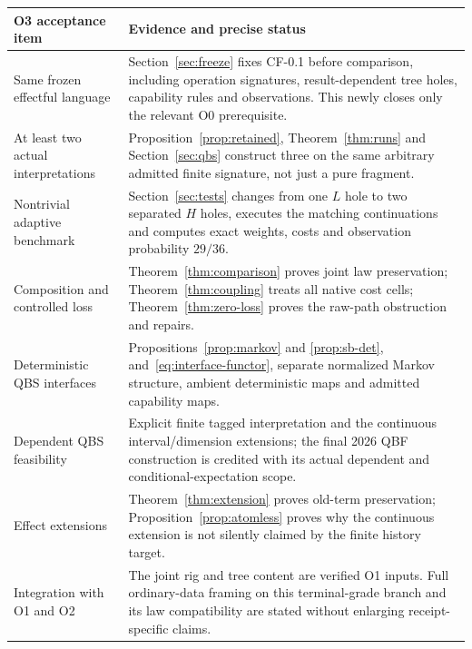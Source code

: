 \documentclass[11pt,a4paper]{article}
\theoremstyle{definition}
\begin{document}
\begin{longtable}{@{}p{.34\linewidth}p{.60\linewidth}@{}}
\toprule
O3 acceptance item&Evidence and precise status\\
\midrule\endhead
Same frozen effectful language&Section~\ref{sec:freeze} fixes CF-0.1 before
comparison, including operation signatures, result-dependent tree holes,
capability rules and observations. This newly closes only the relevant O0
prerequisite.\\
At least two actual interpretations&Proposition~\ref{prop:retained},
Theorem~\ref{thm:runs} and Section~\ref{sec:qbs} construct three on the same
arbitrary admitted finite signature, not just a pure fragment.\\
Nontrivial adaptive benchmark&Section~\ref{sec:tests} changes from one $L$
hole to two separated $H$ holes, executes the matching continuations and
computes exact weights, costs and observation probability $29/36$.\\
Composition and controlled loss&Theorem~\ref{thm:comparison} proves joint
law preservation; Theorem~\ref{thm:coupling} treats all native cost cells;
Theorem~\ref{thm:zero-loss} proves the raw-path obstruction and repairs.\\
Deterministic QBS interfaces&Propositions~\ref{prop:markov} and
\ref{prop:sb-det}, and~\eqref{eq:interface-functor}, separate normalized
Markov structure, ambient deterministic maps and admitted capability maps.\\
Dependent QBS feasibility&Explicit finite tagged interpretation and the
continuous interval/dimension extensions; the final 2026 QBF construction
is credited with its actual dependent and conditional-expectation scope.\\
Effect extensions&Theorem~\ref{thm:extension} proves old-term preservation;
Proposition~\ref{prop:atomless} proves why the continuous extension is not
silently claimed by the finite history target.\\
Integration with O1 and O2&The joint rig and tree content are verified O1
inputs. Full ordinary-data framing on this terminal-grade branch and its
law compatibility are stated without enlarging receipt-specific claims.\\
\bottomrule
\end{longtable}
\end{document}
